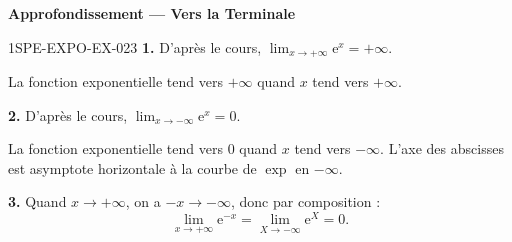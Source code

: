 \begin{center}\textbf{Approfondissement — Vers la Terminale}\end{center}
\begin{corrige}{1SPE-EXPO-EX-023}
\textbf{1.} D'après le cours, $\displaystyle\lim_{x \to +\infty} \mathrm{e}^x = +\infty$.

La fonction exponentielle tend vers $+\infty$ quand $x$ tend vers $+\infty$.

\textbf{2.} D'après le cours, $\displaystyle\lim_{x \to -\infty} \mathrm{e}^x = 0$.

La fonction exponentielle tend vers $0$ quand $x$ tend vers $-\infty$. L'axe des abscisses est asymptote horizontale à la courbe de $\exp$ en $-\infty$.

\textbf{3.} Quand $x \to +\infty$, on a $-x \to -\infty$, donc par composition :
\[\lim_{x \to +\infty} \mathrm{e}^{-x} = \lim_{X \to -\infty} \mathrm{e}^X = 0.\]
\end{corrige}
